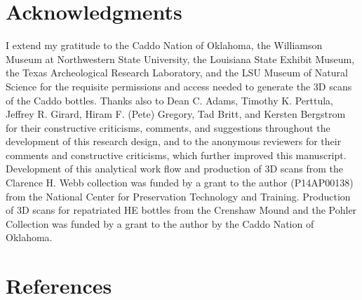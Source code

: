 \documentclass[review]{elsarticle}
\begin{document}
\section*{Acknowledgments}

I extend my gratitude to the Caddo Nation of Oklahoma, the Williamson Museum at Northwestern State University, the Louisiana State Exhibit Museum, the Texas Archeological Research Laboratory, and the LSU Museum of Natural Science for the requisite permissions and access needed to generate the 3D scans of the Caddo bottles. Thanks also to Dean C. Adams, Timothy K. Perttula, Jeffrey R. Girard, Hiram F. (Pete) Gregory, Tad Britt, and Kersten Bergstrom for their constructive criticisms, comments, and suggestions throughout the development of this research design, and to the anonymous reviewers for their comments and constructive criticisms, which further improved this manuscript. Development of this analytical work flow and production of 3D scans from the Clarence H. Webb collection was funded by a grant to the author (P14AP00138) from the National Center for Preservation Technology and Training. Production of 3D scans for repatriated HE bottles from the Crenshaw Mound and the Pohler Collection was funded by a grant to the author by the Caddo Nation of Oklahoma. 

\section*{References}

 
\end{document}
